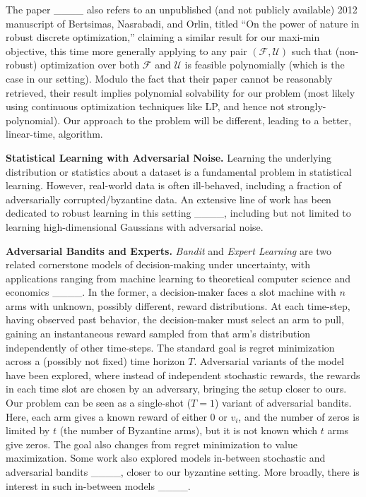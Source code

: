 The paper ____ also refers to an unpublished (and not publicly available) 2012 manuscript of Bertsimas, Nasrabadi, and Orlin, titled ``On the power of nature in robust discrete optimization,'' claiming a similar result for our maxi-min objective, this time more generally applying to any pair $(\mathcal{F}, \mathcal{U})$ such that (non-robust) optimization over both $\mathcal{F}$ and $\mathcal{U}$ is feasible polynomially (which is the case in our setting). Modulo the fact that their paper cannot be reasonably retrieved, their result implies polynomial solvability for our problem (most likely using continuous optimization techniques like LP, and hence not strongly-polynomial). Our approach to the problem will be different, leading to a better, linear-time, algorithm.

\noindent \textbf{Statistical Learning with Adversarial Noise.} Learning the underlying distribution or statistics about a dataset is a fundamental problem in statistical learning. However, real-world data is often ill-behaved, including a fraction of adversarially corrupted/byzantine data. An extensive line of work has been dedicated to robust learning in this setting ____, including but not limited to learning high-dimensional Gaussians with adversarial noise.

\noindent \textbf{Adversarial Bandits and Experts.} \emph{Bandit} and \emph{Expert Learning} are two related cornerstone models of decision-making under uncertainty, with applications ranging from machine learning to theoretical computer science and economics ____. In the former, a decision-maker faces a slot machine with $n$ arms with unknown, possibly different, reward distributions. At each time-step, having observed past behavior, the decision-maker must select an arm to pull, gaining an instantaneous reward sampled from that arm's distribution independently of other time-steps.
The standard goal is regret minimization across a (possibly not fixed) time horizon $T$. Adversarial variants of the model have been explored, where instead of independent stochastic rewards, the rewards in each time slot are chosen by an adversary, bringing the setup closer to ours. Our problem can be seen as a single-shot ($T = 1$) variant of adversarial bandits. Here, each arm gives a known reward of either $0$ or $v_i$, and the number of zeros is limited by $t$ (the number of Byzantine arms), but it is not known which $t$ arms give zeros. The goal also changes from regret minimization to value maximization. Some work also explored models in-between stochastic and adversarial bandits ____, closer to our byzantine setting.
More broadly, there is interest in such in-between models ____.

